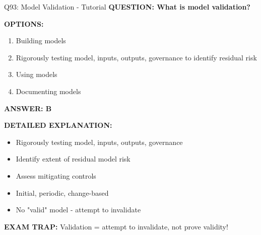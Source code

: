 \documentclass[8pt]{beamer}
\begin{document}
	\begin{frame}{Q93: Model Validation - Tutorial}
		\fontsize{6.5}{7.5}\selectfont
		\textbf{QUESTION: What is model validation?}
		
		\vspace{0.1cm}
		\textbf{OPTIONS:}
		\begin{enumerate}
			\item Building models
			\item Rigorously testing model, inputs, outputs, governance to identify residual risk
			\item Using models
			\item Documenting models
		\end{enumerate}
		
		\vspace{0.1cm}
		\textcolor{myblue}{\textbf{ANSWER: B}}
		
		\vspace{0.1cm}
		\textbf{DETAILED EXPLANATION:}
		\begin{itemize}
			\item Rigorously testing model, inputs, outputs, governance
			\item Identify extent of residual model risk
			\item Assess mitigating controls
			\item Initial, periodic, change-based
			\item No "valid" model - attempt to invalidate
		\end{itemize}
		
		\vspace{0.1cm}
		\textcolor{myred}{\textbf{EXAM TRAP:}} Validation = \textcolor{myblue}{attempt to invalidate, not prove validity}!
	\end{frame}
	
\end{document}
